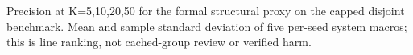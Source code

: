 Precision at K=5,10,20,50 for the formal structural proxy on the capped disjoint benchmark. Mean and sample standard deviation of five per-seed system macros; this is line ranking, not cached-group review or verified harm.
